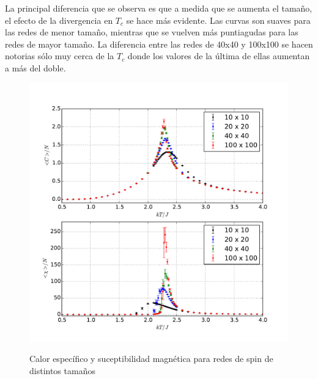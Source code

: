 \documentclass[a4paper,12pt]{article}
\begin{document}
La principal diferencia que se observa es que a medida que se aumenta el 
tamaño, el efecto de la divergencia en $T_c$ se hace más evidente. Las curvas 
son suaves para las redes de menor tamaño, mientras que se vuelven más 
puntiagudas para las redes de mayor tamaño. La diferencia entre las redes de 
40x40 y 100x100 se hacen notorias sólo muy cerca de la $T_c$ donde los valores 
de la última de ellas aumentan a más del doble.

\begin{figure}[H]
    \begin{center}
      \includegraphics[scale=0.7]{tamano_fluctuaciones.pdf} \\
      \caption{Calor específico y suceptibilidad magnética para redes de spin 
      de distintos tamaños}\label{fig:tam_fluctuaciones}
    \end{center}
\end{figure}

\end{document}
